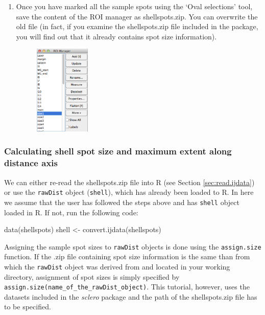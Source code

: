 \documentclass[11pt, a4paper]{article}
\newcommand{\mnote}[1]
{\marginnote{\footnotesize \raggedright \texttt{#1}}}
\newcommand{\sclero}{\textit{sclero}\xspace}
\begin{document}
\begin{enumerate}
\begin{figure}[H]
\begin{center}
\end{center}
\end{figure}
\item Once you have marked all the sample spots using the `Oval selections' tool, save the content of the ROI manager as shellspots.zip. You can overwrite the old file (in fact, if you examine the shellspots.zip file included in the package, you will find out that it already contains spot size information).
\begin{figure}[H]
\begin{center}
\includegraphics[width = 0.25\textwidth]{roi_manager_size.png}
\end{center}
\end{figure}
\end{enumerate}

\subsubsection{Calculating shell spot size and maximum extent along distance axis}

We can either re-read the shellspots.zip file into R (see Section \ref{sec:read.ijdata}) or use the \texttt{rawDist} object (\texttt{shell}), which has already been loaded to R. In here we assume that the user has followed the steps above and has \texttt{shell} object loaded in R. If not, run the following code:

\begin{Schunk}
\begin{Sinput}
 data(shellspots)
 shell <- convert.ijdata(shellspots)
\end{Sinput}
\end{Schunk}

\mnote{assign.
size} Assigning the sample spot sizes to \texttt{rawDist} objects is done using the \texttt{assign.size} function. If the .zip file containing spot size information is the same than from which the \texttt{rawDist} object was derived from and located in your working directory, assignment of spot sizes is simply specified by \texttt{assign.size(name\_of\_the\_rawDist\_object)}. This tutorial, however, uses the datasets included in the \sclero package and the path of the shellspots.zip file has to be specified.
\end{document}
